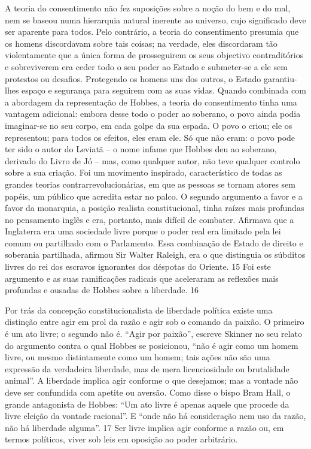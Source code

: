 A teoria do consentimento não fez suposições sobre a noção do bem e do mal, nem se baseou numa hierarquia natural inerente ao universo, cujo significado deve ser aparente para todos. Pelo contrário, a teoria do consentimento presumia que os homens discordavam sobre tais coisas; na verdade, eles discordaram tão violentamente que a única forma de prosseguirem os seus objectivo contraditórios e sobreviverem era ceder todo o seu poder ao Estado e submeter-se a ele sem protestos ou desafios. Protegendo os homens uns dos outros, o Estado garantiu-lhes espaço e segurança para seguirem com as suas vidas. Quando combinada com a abordagem da representação de Hobbes, a teoria do consentimento tinha uma vantagem adicional: embora desse todo o poder ao soberano, o povo ainda podia imaginar-se no seu corpo, em cada golpe da sua espada. O povo o criou; ele os representou; para todos os efeitos, eles eram ele. Só que não eram: o povo pode ter sido o autor do Leviatã – o nome infame que Hobbes deu ao soberano, derivado do Livro de Jó – mas, como qualquer autor, não teve qualquer controlo sobre a sua criação. Foi um movimento inspirado, característico de todas as grandes teorias contrarrevolucionárias, em que as pessoas se tornam atores sem papéis, um público que acredita estar no palco. O segundo argumento a favor e a favor da monarquia, a posição realista constitucional, tinha raízes mais profundas no pensamento inglês e era, portanto, mais difícil de combater. Afirmava que a Inglaterra era uma sociedade livre porque o poder real era limitado pela lei comum ou partilhado com o Parlamento. Essa combinação de Estado de direito e soberania partilhada, afirmou Sir Walter Raleigh, era o que distinguia os súbditos livres do rei dos escravos ignorantes dos déspotas do Oriente.
 {\color{blue} 15}  
Foi este argumento e as suas ramificações radicais que aceleraram as reflexões mais profundas e ousadas de Hobbes sobre a liberdade.
 {\color{blue} 16}  

 
\par
 
Por trás da concepção constitucionalista de liberdade política existe uma distinção entre agir em prol da razão e agir sob o comando da paixão. O primeiro é um ato livre; o segundo não é. “Agir por paixão”, escreve Skinner no seu relato do argumento contra o qual Hobbes se posicionou, “não é agir como um homem livre, ou mesmo distintamente como um homem; tais ações não são uma expressão da verdadeira liberdade, mas de mera licenciosidade ou brutalidade animal”. A liberdade implica agir conforme o que desejamos; mas a vontade não deve ser confundida com apetite ou aversão. Como disse o bispo Bram Hall, o grande antagonista de Hobbes: “Um ato livre é apenas aquele que procede da livre eleição da vontade racional”. E “onde não há consideração nem uso da razão, não há liberdade alguma”.
 {\color{blue} 17}  
Ser livre implica agir conforme a razão ou, em termos políticos, viver sob leis em oposição ao poder arbitrário.
 
